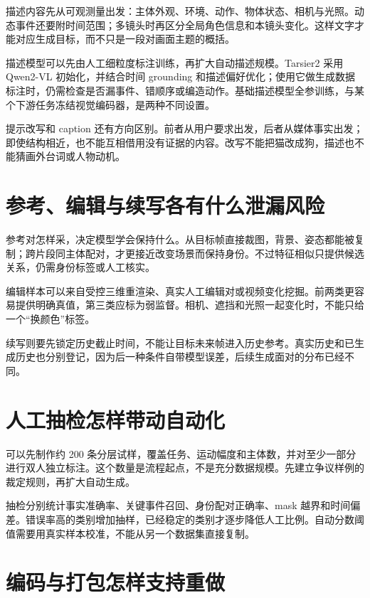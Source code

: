 描述内容先从可观测量出发：主体外观、环境、动作、物体状态、相机与光照。动态事件还要附时间范围；多镜头时再区分全局角色信息和本镜头变化。这样文字才能对应生成目标，而不只是一段对画面主题的概括。

描述模型可以先由人工细粒度标注训练，再扩大自动描述规模。Tarsier2 采用 Qwen2-VL 初始化，并结合时间 grounding 和描述偏好优化；使用它做生成数据标注时，仍需检查是否漏事件、错顺序或编造动作。基础描述模型全参训练，与某个下游任务冻结视觉编码器，是两种不同设置。

提示改写和 caption 还有方向区别。前者从用户要求出发，后者从媒体事实出发；即使结构相近，也不能互相借用没有证据的内容。改写不能把猫改成狗，描述也不能猜画外台词或人物动机。

\section{参考、编辑与续写各有什么泄漏风险}\label{seedance-m11-ux53c2ux8003ux7f16ux8f91ux4e0eux7eedux5199ux5404ux6709ux4ec0ux4e48ux6cc4ux6f0fux98ceux9669}

参考对怎样采，决定模型学会保持什么。从目标帧直接裁图，背景、姿态都能被复制；跨片段同主体配对，才更接近改变场景而保持身份。不过特征相似只提供候选关系，仍需身份标签或人工核实。

编辑样本可以来自受控三维重渲染、真实人工编辑对或视频变化挖掘。前两类更容易提供明确真值，第三类应标为弱监督。相机、遮挡和光照一起变化时，不能只给一个``换颜色''标签。

续写则要先锁定历史截止时间，不能让目标未来帧进入历史参考。真实历史和已生成历史也分别登记，因为后一种条件自带模型误差，后续生成面对的分布已经不同。

\section{人工抽检怎样带动自动化}\label{seedance-m11-ux4ebaux5de5ux62bdux68c0ux600eux6837ux5e26ux52a8ux81eaux52a8ux5316}

可以先制作约 200 条分层试样，覆盖任务、运动幅度和主体数，并对至少一部分进行双人独立标注。这个数量是流程起点，不是充分数据规模。先建立争议样例的裁定规则，再扩大自动生成。

抽检分别统计事实准确率、关键事件召回、身份配对正确率、mask 越界和时间偏差。错误率高的类别增加抽样，已经稳定的类别才逐步降低人工比例。自动分数阈值需要用真实样本校准，不能从另一个数据集直接复制。

\section{编码与打包怎样支持重做}\label{seedance-m11-ux7f16ux7801ux4e0eux6253ux5305ux600eux6837ux652fux6301ux91cdux505a}

